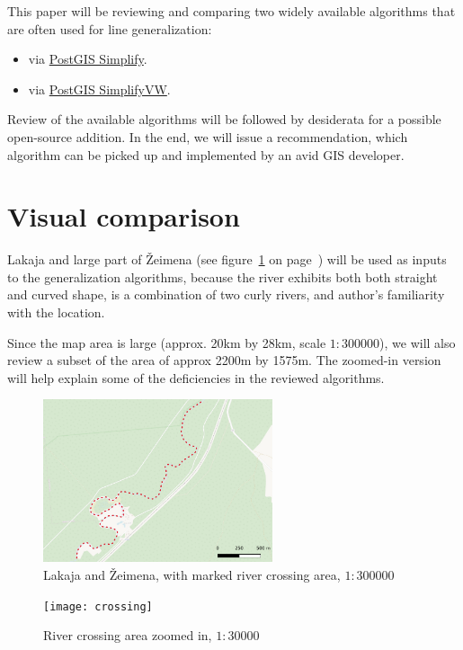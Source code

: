 \documentclass[a4paper]{article}
\begin{document}
This paper will be reviewing and comparing two widely available algorithms that
are often used for line generalization:
\begin{itemize}
    \item \cite{douglas1973algorithms} via
        \href{https://postgis.net/docs/ST_Simplify.html}{PostGIS Simplify}.

    \item \cite{visvalingam1993line} via
        \href{https://postgis.net/docs/ST_SimplifyVW.html}{PostGIS SimplifyVW}.
\end{itemize}

Review of the available algorithms will be followed by desiderata for a
possible open-source addition. In the end, we will issue a recommendation,
which algorithm can be picked up and implemented by an avid GIS developer.

\section{Visual comparison}

Lakaja and large part of Žeimena (see figure~\ref{fig:zeimena} on
page~\pageref{fig:zeimena}) will be used as inputs to the generalization
algorithms, because the river exhibits both both straight and curved shape, is
a combination of two curly rivers, and author's familiarity with the location.

Since the map area is large (approx. 20km by 28km, scale $1:300 000$), we will
also review a subset of the area of approx 2200m by 1575m. The zoomed-in
version will help explain some of the deficiencies in the reviewed algorithms.

\begin{figure}[H]
    \centering
    \includegraphics[width=67.5mm]{zeimena}
    \caption{Lakaja and Žeimena, with marked river crossing area, $1:300 000$}
    \label{fig:zeimena}
\end{figure}

\begin{figure}[h]
    \centering
    \texttt{[image: crossing]}
    \caption{River crossing area zoomed in, $1:30 000$}
    \label{fig:crossing}
\end{figure}
\end{document}
